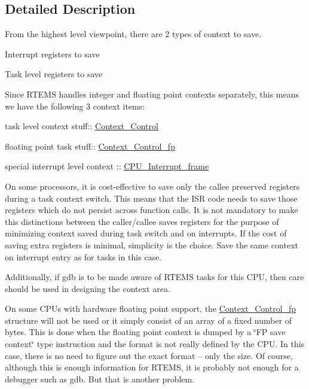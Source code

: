 \subsection{Detailed Description}
From the highest level viewpoint, there are 2 types of context to save.


\begin{DoxyEnumerate}
\item Interrupt registers to save
\item Task level registers to save
\end{DoxyEnumerate}

Since R\+T\+E\+MS handles integer and floating point contexts separately, this means we have the following 3 context items\+:


\begin{DoxyEnumerate}
\item task level context stuff\+:\+: \mbox{\hyperlink{structContext__Control}{Context\+\_\+\+Control}}
\item floating point task stuff\+:\+: \mbox{\hyperlink{structContext__Control__fp}{Context\+\_\+\+Control\+\_\+fp}}
\item special interrupt level context \+:: \mbox{\hyperlink{structCPU__Interrupt__frame}{C\+P\+U\+\_\+\+Interrupt\+\_\+frame}}
\end{DoxyEnumerate}

On some processors, it is cost-\/effective to save only the callee preserved registers during a task context switch. This means that the I\+SR code needs to save those registers which do not persist across function calls. It is not mandatory to make this distinctions between the caller/callee saves registers for the purpose of minimizing context saved during task switch and on interrupts. If the cost of saving extra registers is minimal, simplicity is the choice. Save the same context on interrupt entry as for tasks in this case.

Additionally, if gdb is to be made aware of R\+T\+E\+MS tasks for this C\+PU, then care should be used in designing the context area.

On some C\+P\+Us with hardware floating point support, the \mbox{\hyperlink{structContext__Control__fp}{Context\+\_\+\+Control\+\_\+fp}} structure will not be used or it simply consist of an array of a fixed number of bytes. This is done when the floating point context is dumped by a \char`\"{}\+F\+P save context\char`\"{} type instruction and the format is not really defined by the C\+PU. In this case, there is no need to figure out the exact format -- only the size. Of course, although this is enough information for R\+T\+E\+MS, it is probably not enough for a debugger such as gdb. But that is another problem.

